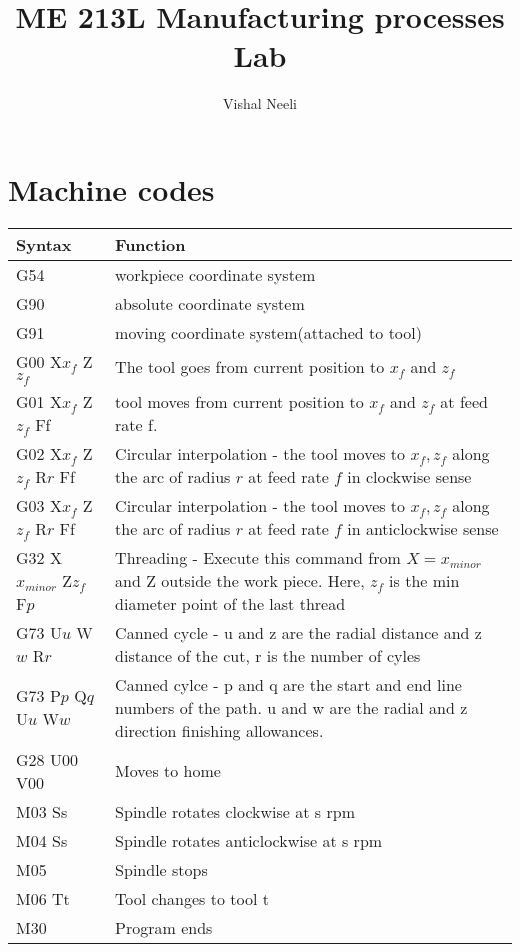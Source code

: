 \documentclass{article}
\title{ME 213L Manufacturing processes Lab}
\author{Vishal Neeli}
\begin{document}
\maketitle

\section{Machine codes}
\begin{tabular}{|m{12em}|m{30em}|}
	\hline
	\textbf{Syntax} & \textbf{Function}\\
	\hline
	\hline
	G54 & workpiece coordinate system\\
	\hline
	G90 & absolute coordinate system\\
	\hline
	G91 & moving coordinate system(attached to tool)\\
	\hline
	G00 X$x_f$ Z$z_f$ & The tool goes from current position to $x_f$ and $z_f$\\
	\hline
	G01 X$x_f$ Z$z_f$ Ff & tool moves from current position to $x_f$ and $z_f$ at feed rate f.\\
	\hline
	G02 X$x_f$ Z$z_f$ R$r$ Ff & Circular interpolation - the tool moves to $x_f,z_f$ along the arc of radius $r$ at feed rate $f$ in clockwise sense\\
	\hline
	G03 X$x_f$ Z$z_f$ R$r$ Ff & Circular interpolation - the tool moves to $x_f,z_f$ along the arc of radius $r$ at feed rate $f$ in anticlockwise sense\\
	\hline
	G32 X$x_{minor}$ Z$z_f$ F$p$ & Threading - Execute this command from $X=x_{minor}$ and Z outside the work piece. Here, $z_f$ is the min diameter point of the last thread\\
	\hline
	G73 U$u$ W$w$ R$r$ & Canned cycle - u and z are the radial distance and z distance of the cut, r is the number of cyles\\
	G73 P$p$ Q$q$ U$u$ W$w$ & Canned cylce - p and q are the start and end line numbers of the path. u and w are the radial and z direction finishing allowances.\\
	\hline
	G28 U00 V00 & Moves to home \\%
	\hline
	M03 Ss & Spindle rotates clockwise at s rpm\\
	\hline
	M04 Ss & Spindle rotates anticlockwise at s rpm\\
	\hline
	M05 & Spindle stops\\
	\hline
	M06 Tt & Tool changes to tool t\\
	\hline
	M30 & Program ends\\
	\hline
	
\end{tabular}
\end{document}

